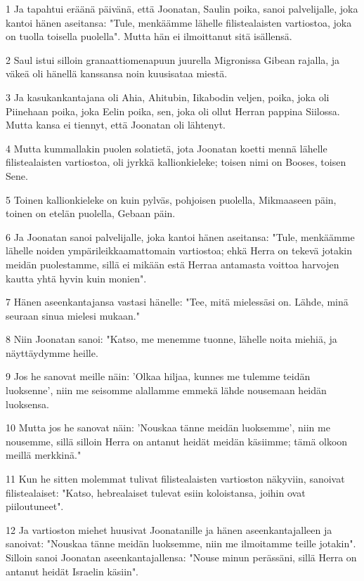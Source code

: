 \par 1 Ja tapahtui eräänä päivänä, että Joonatan, Saulin poika, sanoi palvelijalle, joka kantoi hänen aseitansa: "Tule, menkäämme lähelle filistealaisten vartiostoa, joka on tuolla toisella puolella". Mutta hän ei ilmoittanut sitä isällensä.
\par 2 Saul istui silloin granaattiomenapuun juurella Migronissa Gibean rajalla, ja väkeä oli hänellä kanssansa noin kuusisataa miestä.
\par 3 Ja kasukankantajana oli Ahia, Ahitubin, Iikabodin veljen, poika, joka oli Piinehaan poika, joka Eelin poika, sen, joka oli ollut Herran pappina Siilossa. Mutta kansa ei tiennyt, että Joonatan oli lähtenyt.
\par 4 Mutta kummallakin puolen solatietä, jota Joonatan koetti mennä lähelle filistealaisten vartiostoa, oli jyrkkä kallionkieleke; toisen nimi on Booses, toisen Sene.
\par 5 Toinen kallionkieleke on kuin pylväs, pohjoisen puolella, Mikmaaseen päin, toinen on etelän puolella, Gebaan päin.
\par 6 Ja Joonatan sanoi palvelijalle, joka kantoi hänen aseitansa: "Tule, menkäämme lähelle noiden ympärileikkaamattomain vartiostoa; ehkä Herra on tekevä jotakin meidän puolestamme, sillä ei mikään estä Herraa antamasta voittoa harvojen kautta yhtä hyvin kuin monien".
\par 7 Hänen aseenkantajansa vastasi hänelle: "Tee, mitä mielessäsi on. Lähde, minä seuraan sinua mielesi mukaan."
\par 8 Niin Joonatan sanoi: "Katso, me menemme tuonne, lähelle noita miehiä, ja näyttäydymme heille.
\par 9 Jos he sanovat meille näin: 'Olkaa hiljaa, kunnes me tulemme teidän luoksenne', niin me seisomme alallamme emmekä lähde nousemaan heidän luoksensa.
\par 10 Mutta jos he sanovat näin: 'Nouskaa tänne meidän luoksemme', niin me nousemme, sillä silloin Herra on antanut heidät meidän käsiimme; tämä olkoon meillä merkkinä."
\par 11 Kun he sitten molemmat tulivat filistealaisten vartioston näkyviin, sanoivat filistealaiset: "Katso, hebrealaiset tulevat esiin koloistansa, joihin ovat piiloutuneet".
\par 12 Ja vartioston miehet huusivat Joonatanille ja hänen aseenkantajalleen ja sanoivat: "Nouskaa tänne meidän luoksemme, niin me ilmoitamme teille jotakin". Silloin sanoi Joonatan aseenkantajallensa: "Nouse minun perässäni, sillä Herra on antanut heidät Israelin käsiin".
